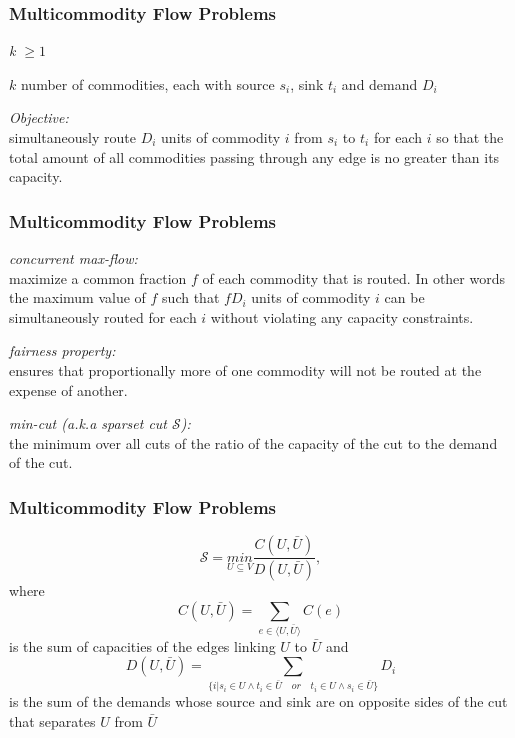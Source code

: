 \begin{frame}
\frametitle{Multicommodity Flow Problems}
\begin{center}
\textit {k $ \ge 1$}\\
\end{center}

$k$ number of commodities, each with source $s_i$, sink $t_i$ and demand $D_i$

\textit{Objective:}\\
simultaneously route $D_i$ units of commodity $i$ from $s_i$ to $t_i$ for each $i$ so that the total amount of all commodities passing through any edge is no greater than its capacity.
\end{frame}


\begin{frame}
\frametitle{Multicommodity Flow Problems}
\textit{concurrent max-flow:}\\
maximize a common fraction $f$ of each commodity that is routed. In other words the maximum value of $f$ such that $fD_i$ units of commodity $i$ can be simultaneously routed for each $i$ without violating any capacity constraints.

\textit{fairness property:}\\
ensures that proportionally more of one commodity will not be routed at the expense of another.

\textit{min-cut (a.k.a sparset cut $\mathscr{S}$):}\\
the minimum over all cuts of the ratio of the capacity of the cut to the demand of the cut.
\end{frame}

\begin{frame}
\frametitle{Multicommodity Flow Problems}
$$ \mathscr{S} = \underset{U \subseteq V }{min} \frac{C(U,\bar{U})}{D(U,\bar{U})}, $$
where 
$$ C(U,\bar{U}) = \sum_{e \in \langle U, \bar{U} \rangle} C(e) $$
is the sum of capacities of the edges linking $U$ to $\bar{U}$ and 
$$ D(U,\bar{U}) = \sum_{ \{ i | s_i \in U \land t_i \in \bar{U}\quad or \quad t_i \in U \land s_i \in \bar{U} \} } D_i $$
is the sum of the demands whose source and sink are on opposite sides of the cut that separates $U$ from $\bar{U}$
\end{frame}

